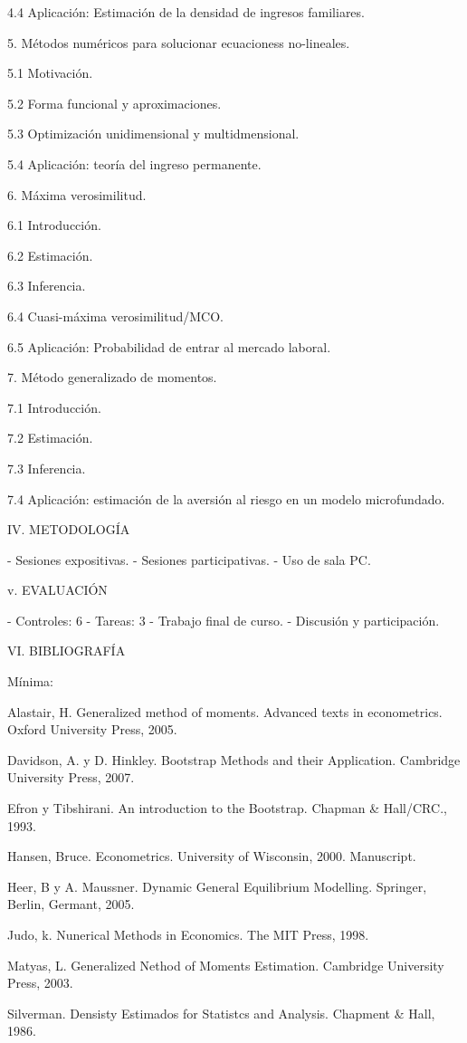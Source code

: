 4.4 Aplicación: Estimación de la densidad de ingresos familiares.


5. Métodos numéricos para solucionar ecuacioness no-lineales.

5.1 Motivación.

5.2 Forma funcional y aproximaciones.

5.3 Optimización unidimensional y multidmensional.

5.4 Aplicación: teoría del ingreso permanente.


6. Máxima verosimilitud.

6.1 Introducción.

6.2 Estimación.

6.3 Inferencia.

6.4 Cuasi-máxima verosimilitud/MCO.

6.5 Aplicación: Probabilidad de entrar al mercado laboral.


7. Método generalizado de momentos.

7.1 Introducción.

7.2 Estimación.

7.3 Inferencia.

7.4 Aplicación: estimación de la aversión al riesgo en un modelo microfundado.


IV. METODOLOGÍA

- Sesiones expositivas.
- Sesiones participativas.
- Uso de sala PC.


v. EVALUACIÓN

- Controles: 6
- Tareas: 3
- Trabajo final de curso.
- Discusión y participación.


VI. BIBLIOGRAFÍA

Mínima:

Alastair, H. Generalized method of moments. Advanced texts in econometrics. Oxford University Press, 2005.

Davidson, A. y D. Hinkley. Bootstrap Methods and their Application. Cambridge University Press, 2007.

Efron y Tibshirani. An introduction to the Bootstrap. Chapman & Hall/CRC., 1993.

Hansen, Bruce. Econometrics. University of Wisconsin, 2000. Manuscript.

Heer, B y A. Maussner. Dynamic General Equilibrium Modelling. Springer, Berlin, Germant, 2005.

Judo, k. Nunerical Methods in Economics. The MIT Press, 1998.

Matyas, L. Generalized Nethod of Moments Estimation. Cambridge University Press, 2003.

Silverman. Densisty Estimados for Statistcs and Analysis. Chapment & Hall, 1986.



